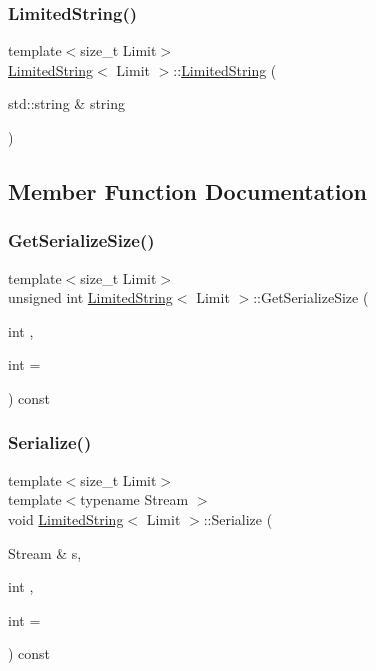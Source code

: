 \subsubsection{\texorpdfstring{Limited\+String()}{LimitedString()}}
{\footnotesize\ttfamily template$<$size\+\_\+t Limit$>$ \\
\mbox{\hyperlink{class_limited_string}{Limited\+String}}$<$ Limit $>$\+::\mbox{\hyperlink{class_limited_string}{Limited\+String}} (\begin{DoxyParamCaption}\item[{std\+::string \&}]{string }\end{DoxyParamCaption})\hspace{0.3cm}{\ttfamily [inline]}}



\subsection{Member Function Documentation}
\mbox{\label{class_limited_string_a9b5f6a92ed889442a212444ed51fcea9}} 
\subsubsection{\texorpdfstring{Get\+Serialize\+Size()}{GetSerializeSize()}}
{\footnotesize\ttfamily template$<$size\+\_\+t Limit$>$ \\
unsigned int \mbox{\hyperlink{class_limited_string}{Limited\+String}}$<$ Limit $>$\+::Get\+Serialize\+Size (\begin{DoxyParamCaption}\item[{int}]{,  }\item[{int}]{ = {} }\end{DoxyParamCaption}) const\hspace{0.3cm}{\ttfamily [inline]}}

\mbox{\label{class_limited_string_acb90369fef0efc1d51b730baa23307d8}} 
\subsubsection{\texorpdfstring{Serialize()}{Serialize()}}
{\footnotesize\ttfamily template$<$size\+\_\+t Limit$>$ \\
template$<$typename Stream $>$ \\
void \mbox{\hyperlink{class_limited_string}{Limited\+String}}$<$ Limit $>$\+::Serialize (\begin{DoxyParamCaption}\item[{Stream \&}]{s,  }\item[{int}]{,  }\item[{int}]{ = {} }\end{DoxyParamCaption}) const\hspace{0.3cm}{\ttfamily [inline]}}

